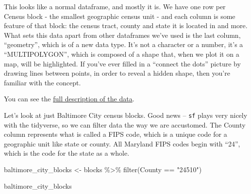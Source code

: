 \documentclass[
  letterpaper,
  DIV=11,
  numbers=noendperiod]{scrreprt}
\newenvironment{Shaded}{\begin{snugshade}}{\end{snugshade}}
\newcommand{\FunctionTok}[1]{\textcolor[rgb]{0.28,0.35,0.67}{#1}}
\newcommand{\NormalTok}[1]{\textcolor[rgb]{0.00,0.23,0.31}{#1}}
\newcommand{\OtherTok}[1]{\textcolor[rgb]{0.00,0.23,0.31}{#1}}
\newcommand{\SpecialCharTok}[1]{\textcolor[rgb]{0.37,0.37,0.37}{#1}}
\newcommand{\StringTok}[1]{\textcolor[rgb]{0.13,0.47,0.30}{#1}}
\begin{document}
This looks like a normal dataframe, and mostly it is. We have one row
per Census block - the smallest geographic census unit - and each column
is some feature of that block: the census tract, county and state it is
located in and more. What sets this data apart from other dataframes
we've used is the last column, ``geometry'', which is of a new data
type. It's not a character or a number, it's a ``MULTIPOLYGON'', which
is composed of a shape that, when we plot it on a map, will be
highlighted. If you've ever filled in a ``connect the dots'' picture by
drawing lines between points, in order to reveal a hidden shape, then
you're familiar with the concept.

You can see the
\href{https://redistricting.maryland.gov/Documents/Data/DataDictionary.pdf}{full
description of the data}.

Let's look at just Baltimore City census blocks. Good news --
\texttt{sf} plays very nicely with the tidyverse, so we can filter data
the way we are accustomed. The County column represents what is called a
FIPS code, which is a unique code for a geographic unit like state or
county. All Maryland FIPS codes begin with ``24'', which is the code for
the state as a whole.

\begin{Shaded}
\begin{Highlighting}[]
\NormalTok{baltimore\_city\_blocks }\OtherTok{\textless{}{-}}\NormalTok{ blocks }\SpecialCharTok{\%\textgreater{}\%}
  \FunctionTok{filter}\NormalTok{(County }\SpecialCharTok{==} \StringTok{"24510"}\NormalTok{)}

\NormalTok{baltimore\_city\_blocks}
\end{Highlighting}
\end{Shaded}
\end{document}
